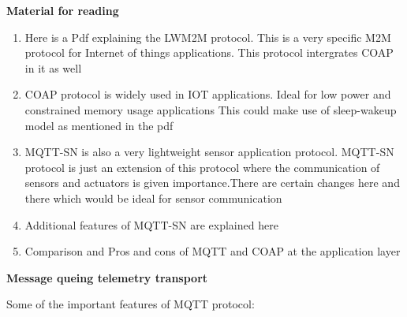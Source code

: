 \documentclass[16pt]{article}
\begin{document}
\textbf{Material for reading}

\begin{enumerate}

\item
  Here is a Pdf explaining the LWM2M protocol. This is a very specific
  M2M protocol for Internet of things
  applications.%
  This protocol intergrates COAP in it as well
\item
  COAP protocol is widely used in IOT applications. Ideal for low power
  and constrained memory usage applications
  This could make use of sleep-wakeup model as mentioned in the pdf
\item
  MQTT-SN is also a very lightweight sensor application protocol.
  MQTT-SN protocol is just an extension of this protocol where the
  communication of sensors and actuators is given importance.There are
  certain changes here and there which would be ideal for sensor
  communication
\item
  Additional features of MQTT-SN are explained here
\item
  Comparison and Pros and cons of MQTT and COAP at the application layer
\end{enumerate}

\vspace{0.5cm}

{\LARGE{\textbf{Message queing telemetry transport}}}

\vspace{0.5cm}
Some of the important features of MQTT protocol:
\end{document}
